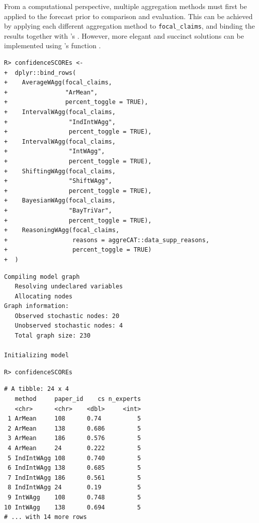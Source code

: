 \documentclass[article]{jss}
\newcommand{\fct}[1]{\code{#1()}}
\begin{document}
From a computational perspective, multiple aggregation methods must
first be applied to the forecast prior to comparison and evaluation.
This can be achieved by applying each different aggregation method to
\texttt{focal\_claims}, and binding the results together with
's \fct{row_bind}. However, more elegant and succinct
solutions can be implemented using 's \fct{map_dfr} function
\citep[see Listing~\ref{lst-multi-method-workflow-non-supp} and
Listing~\ref{lst-multi-method-workflow-both}]{purrr2020}.

\begin{verbatim}
R> confidenceSCOREs <- 
+  dplyr::bind_rows(
+    AverageWAgg(focal_claims,
+                "ArMean", 
+                percent_toggle = TRUE),
+    IntervalWAgg(focal_claims,
+                 "IndIntWAgg", 
+                 percent_toggle = TRUE),
+    IntervalWAgg(focal_claims,
+                 "IntWAgg", 
+                 percent_toggle = TRUE),
+    ShiftingWAgg(focal_claims,
+                 "ShiftWAgg", 
+                 percent_toggle = TRUE),
+    BayesianWAgg(focal_claims,
+                 "BayTriVar", 
+                 percent_toggle = TRUE),
+    ReasoningWAgg(focal_claims, 
+                  reasons = aggreCAT::data_supp_reasons, 
+                  percent_toggle = TRUE)
+  )
\end{verbatim}

\begin{verbatim}
Compiling model graph
   Resolving undeclared variables
   Allocating nodes
Graph information:
   Observed stochastic nodes: 20
   Unobserved stochastic nodes: 4
   Total graph size: 230

Initializing model
\end{verbatim}

\begin{verbatim}
R> confidenceSCOREs
\end{verbatim}

\begin{verbatim}
# A tibble: 24 x 4
   method     paper_id    cs n_experts
   <chr>      <chr>    <dbl>     <int>
 1 ArMean     108      0.74          5
 2 ArMean     138      0.686         5
 3 ArMean     186      0.576         5
 4 ArMean     24       0.222         5
 5 IndIntWAgg 108      0.740         5
 6 IndIntWAgg 138      0.685         5
 7 IndIntWAgg 186      0.561         5
 8 IndIntWAgg 24       0.19          5
 9 IntWAgg    108      0.748         5
10 IntWAgg    138      0.694         5
# ... with 14 more rows
\end{verbatim}
\end{document}
